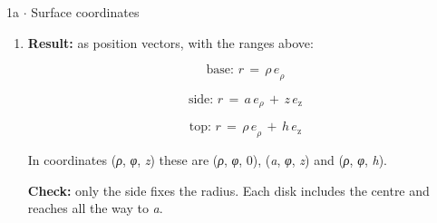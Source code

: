 \documentclass[11pt]{article}
\begin{document}
\begin{keepsection}
\begin{workedbox}{1a \ensuremath{\cdot} Surface coordinates}
\begin{enumerate}
\begin{equation*}{z}\, =\, {h};\, 0\, \leq \, {ρ}\, \leq \, {a};\, 0\, \leq \, {φ}\, <\, 2π\end{equation*}
\item {}
\textbf{Result:} as position vectors, with the ranges above:

\begin{equation*}\text{base}:\, {r}\, =\, {ρ\,e}_{ρ}\end{equation*}

\begin{equation*}\text{side}:\, {r}\, =\, {a\,e}_{ρ}\, +\, {z\,e}_{\mathrm{z}}\end{equation*}

\begin{equation*}\text{top}:\, {r}\, =\, {ρ\,e}_{ρ}\, +\, {h\,e}_{\mathrm{z}}\end{equation*}

In coordinates (\textit{ρ}, \textit{φ}, \textit{z}) these are (\textit{ρ}, \textit{φ}, 0), (\textit{a}, \textit{φ}, \textit{z}) and (\textit{ρ}, \textit{φ}, \textit{h}).

\textbf{Check:} only the side fixes the radius. Each disk includes the centre and reaches all the way to \textit{a}.
\end{enumerate}
\end{workedbox}

\end{keepsection}
\end{document}

